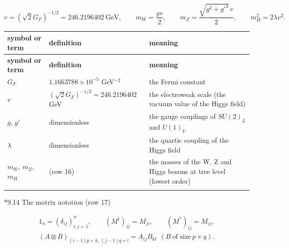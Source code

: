 \documentclass[10pt,a4paper]{article}
\makeatletter
\renewcommand\subsection{\@startsection{subsection}{2}{\z@}{-3.25ex\@plus -1ex \@minus -.2ex}{1.5ex \@plus .2ex}{\normalfont\large\bfseries\raggedright}}
\makeatother
\begin{document}
\begin{equation*}
v=(\sqrt2G_F)^{-1/2}=246.2196402\ \text{GeV},\qquad m_W=\frac{gv}2,\qquad m_Z=\frac{\sqrt{g^2+g'^2}\,v}2,\qquad m_H^2=2\lambda v^2 .
\end{equation*}
{\footnotesize
\begin{longtable}{>{\raggedright\arraybackslash}p{}>{\raggedright\arraybackslash}p{}>{\raggedright\arraybackslash}p{}}
\toprule
\textbf{symbol or term} & \textbf{definition} & \textbf{meaning} \\
\midrule\endfirsthead
\toprule
\textbf{symbol or term} & \textbf{definition} & \textbf{meaning} \\
\midrule\endhead
\endfoot
\bottomrule\endlastfoot
$G_F$ & $1.1663788\times10^{-5}$ GeV$^{-2}$ & the Fermi constant \\
$v$ & $(\sqrt2G_F)^{-1/2}=246.2196402$ GeV & the electroweak scale (the vacuum value of the Higgs field) \\
$g$, $g'$ & dimensionless & the gauge couplings of $SU(2)_L$ and $U(1)_Y$ \\
$\lambda$ & dimensionless & the quartic coupling of the Higgs field \\
$m_W$, $m_Z$, $m_H$ & (row 16) & the masses of the W, Z and Higgs bosons at tree level (lowest order) \\*
\end{longtable}}
\subsection*{9.14 The matrix notation (row 17)}
\begin{gather*}
1_n=(\delta_{ij})_{i,j=1}^n,\qquad (M^\dagger)_{ij}=\overline{M_{ji}},\qquad (M^*)_{ij}=\overline{M_{ij}},\\ (A\otimes B)_{(i-1)p+k,\,(j-1)q+l}=A_{ij}B_{kl}\ \ (B\ \text{of size}\ p\times q).
\end{gather*}
\end{document}
